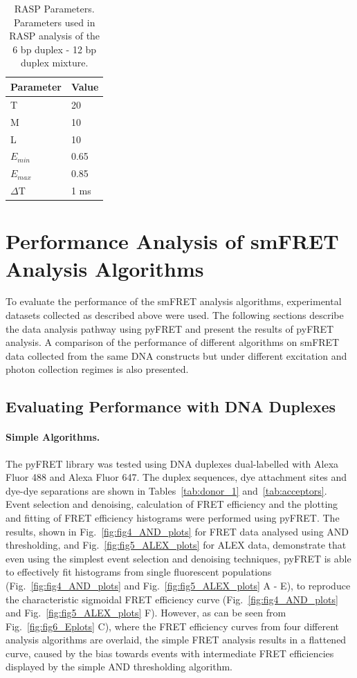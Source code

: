 \begin{table}[!ht]
\caption{
{RASP Parameters}. Parameters used in RASP analysis of the 6 bp duplex - 12 bp duplex mixture.}
\begin{tabular}{|l|l|}
\hline
Parameter & Value \\
\hline
T & 20 \\
M & 10 \\
L & 10 \\
$E_{min}$ & 0.65 \\
$E_{max}$ & 0.85 \\
$\Delta$T & 1 ms \\
\hline
\end{tabular}

\label{tab:RASP}
\end{table}

\section{Performance Analysis of smFRET Analysis Algorithms}
\label{sect:performance_analysis}
To evaluate the performance of the smFRET analysis algorithms, experimental datasets collected as described above were used. The following sections describe the data analysis pathway using pyFRET and present the results of pyFRET analysis. A comparison of the performance of different algorithms on smFRET data collected from the same DNA constructs but under different excitation and photon collection regimes is also presented.

\subsection{Evaluating Performance with DNA Duplexes}
\paragraph{Simple Algorithms.}
The pyFRET library was tested using DNA duplexes dual-labelled with Alexa Fluor 488 and Alexa Fluor 647. The duplex sequences, dye attachment sites and dye-dye separations are shown in Tables~\ref{tab:donor_1} and~\ref{tab:acceptors}. Event selection and denoising, calculation of FRET efficiency and the plotting and fitting of FRET efficiency histograms were performed using pyFRET. The results, shown in Fig.~\ref{fig:fig4_AND_plots} for FRET data analysed using AND thresholding, and Fig.~\ref{fig:fig5_ALEX_plots} for ALEX data, demonstrate that even using the simplest event selection and denoising techniques, pyFRET is able to effectively fit histograms from single fluorescent populations (Fig.~\ref{fig:fig4_AND_plots} and Fig.~\ref{fig:fig5_ALEX_plots} A - E), to reproduce the characteristic sigmoidal FRET efficiency curve (Fig.~\ref{fig:fig4_AND_plots} and Fig.~\ref{fig:fig5_ALEX_plots} F). However, as can be seen from Fig.~\ref{fig:fig6_Eplots} C), where the FRET efficiency curves from four different analysis algorithms are overlaid, the simple FRET analysis results in a flattened curve, caused by the bias towards events with intermediate FRET efficiencies displayed by the simple AND thresholding algorithm. 

